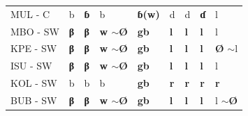 \documentclass[output=paper,colorlinks,citecolor=brown
]{langscibook}
\begin{document}
\begin{table}
{\begin{tabular}{lllllllll}
MUL - C      & b                                                                    & \textbf{ɓ}                           & b                                                                    & \textbf{ɓ(w)}                                                             & d            & d                                                                & \textbf{ɗ}                             & l             \\
MBO - SW     & \textbf{β}                                                                    & \textbf{β}                           & \textbf{w $\sim$Ø}                                                            & \textbf{gb}                                                               & \textbf{l}            & \textbf{l}                                                                & \textbf{l}                             & l             \\
KPE - SW     & \textbf{β}                                                                    & \textbf{β}                           & \textbf{w $\sim$Ø}                                                            & \textbf{gb}                                                               & \textbf{l}            & \textbf{l}                                                                & \textbf{l}                             & \textbf{Ø} $\sim$l     \\
ISU - SW     & \textbf{β}                                                                    & \textbf{β}                           & \textbf{w $\sim$Ø}                                                            & \textbf{gb}                                                               & \textbf{l}            & \textbf{l}                                                                & \textbf{l}                             & l             \\
KOL - SW     & b                                                                    & b                           & b                                                                    & \textbf{gb}                                                               & \textbf{r}            & \textbf{r}                                                                & \textbf{r}                             & \textbf{r}             \\
BUB - SW     & \textbf{β}                                                                    & \textbf{β}                           & \textbf{w $\sim$Ø}                                                            & \textbf{gb}                                                               & \textbf{l}            & \textbf{l}                                                                & \textbf{l}                             & l $\sim$\textbf{Ø}     \\

\end{tabular}}
\end{table}
\end{document}
